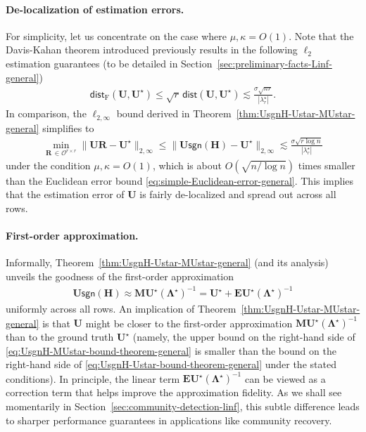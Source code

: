 \paragraph{De-localization of estimation errors.} For simplicity, let us concentrate on the case where $\mu,\kappa =O(1)$.   Note that the Davis-Kahan theorem introduced previously results in the following $\ell_2$ estimation guarantees (to be detailed in Section~\ref{sec:preliminary-facts-Linf-general})
%
\begin{align}
	\mathsf{dist}_{\mathrm{F}}(\bm{U},\bm{U}^{\star})  \leq \sqrt{r} \,\mathsf{dist}(\bm{U},\bm{U}^{\star}) \lesssim  \frac{\sigma \sqrt{nr}}{|\lambda_r^{\star}|}.
	\label{eq:simple-Euclidean-error-general}
\end{align}
%
In comparison, the $\ell_{2,\infty}$ bound derived in  Theorem~\ref{thm:UsgnH-Ustar-MUstar-general} simplifies to
%
\begin{align}
	\min_{\bm{R}\,\in \mathcal{O}^{r\times r}}\big\|\bm{U} \bm{R}-\bm{U}^{\star}\big\|_{2,\infty}
	 \leq \big\|\bm{U}\mathsf{sgn}(\bm{H})-\bm{U}^{\star}\big\|_{2,\infty}  \lesssim  \frac{\sigma \sqrt{r\log n}}{ |\lambda_{r}^{\star}| }
	 \label{eq:Linf-eigen-bound-simpler}
\end{align}
%
under the condition $\mu,\kappa = O(1)$,  which is about $O(\sqrt{n/\log n})$ times smaller than the Euclidean error bound \eqref{eq:simple-Euclidean-error-general}.
This implies that the estimation error of $\bm{U}$ is fairly de-localized and spread out across all rows.


\paragraph{First-order approximation.}
Informally, Theorem~\ref{thm:UsgnH-Ustar-MUstar-general} (and its analysis) unveils the goodness of the first-order approximation
%
\begin{align}
	\bm{U}\mathsf{sgn}(\bm{H}) \approx \bm{M}\bm{U}^{\star}(\bm{\Lambda}^{\star})^{-1} = \bm{U}^{\star} + \bm{E}\bm{U}^{\star}(\bm{\Lambda}^{\star})^{-1}
\end{align}
%
uniformly across all rows. An implication of Theorem~\ref{thm:UsgnH-Ustar-MUstar-general} is that $\bm{U}$ might be closer to the first-order approximation $\bm{M}\bm{U}^{\star}(\bm{\Lambda}^{\star})^{-1}$ than to the ground truth $\bm{U}^{\star}$ (namely, the upper bound on the right-hand side of  \eqref{eq:UsgnH-MUstar-bound-theorem-general} is smaller than the bound on the right-hand side of \eqref{eq:UsgnH-Ustar-bound-theorem-general} under the stated conditions). In principle, the linear term $\bm{E}\bm{U}^{\star}(\bm{\Lambda}^{\star})^{-1}$ can be viewed as a correction term that helps improve the approximation fidelity.
As we shall see momentarily in Section~\ref{sec:community-detection-linf}, this subtle difference leads to sharper performance guarantees in applications like community recovery.




